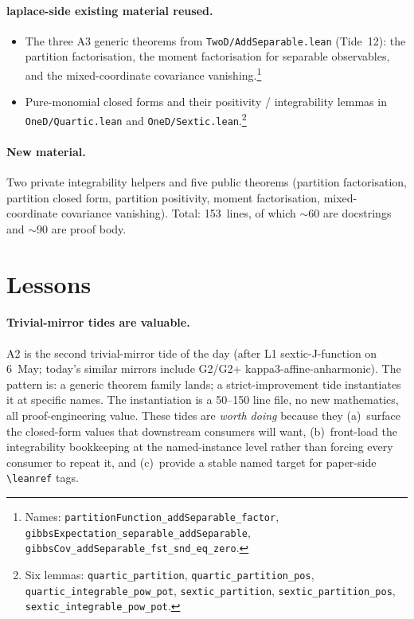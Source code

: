 \documentclass[11pt]{article}
\begin{document}
\paragraph{laplace-side existing material reused.}
\begin{itemize}[leftmargin=2em]
\item The three A3 generic theorems from \texttt{TwoD/AddSeparable.lean}
(Tide~12): the partition factorisation, the moment factorisation
for separable observables, and the mixed-coordinate covariance
vanishing.\footnote{Names: \texttt{partitionFunction\_addSeparable\_factor},
\texttt{gibbsExpectation\_separable\_addSeparable},
\texttt{gibbsCov\_addSeparable\_fst\_snd\_eq\_zero}.}

\item Pure-monomial closed forms and their positivity / integrability
lemmas in \texttt{OneD/Quartic.lean} and
\texttt{OneD/Sextic.lean}.\footnote{Six lemmas:
\texttt{quartic\_partition},
\texttt{quartic\_partition\_pos},
\texttt{quartic\_integrable\_pow\_pot},
\texttt{sextic\_partition},
\texttt{sextic\_partition\_pos},
\texttt{sextic\_integrable\_pow\_pot}.}
\end{itemize}

\paragraph{New material.} Two private integrability helpers and
five public theorems (partition factorisation, partition closed
form, partition positivity, moment factorisation, mixed-coordinate
covariance vanishing). Total: 153~lines, of which $\sim$60 are
docstrings and $\sim$90 are proof body.

\section{Lessons}

\paragraph{Trivial-mirror tides are valuable.}
A2 is the second trivial-mirror tide of the day (after L1 sextic-J-function
on 6~May; today's similar mirrors include G2/G2+ kappa3-affine-anharmonic).
The pattern is: a generic theorem family lands; a strict-improvement
tide instantiates it at specific names. The instantiation is a 50--150
line file, no new mathematics, all proof-engineering value. These
tides are \emph{worth doing} because they (a)~surface the closed-form
values that downstream consumers will want, (b)~front-load the
integrability bookkeeping at the named-instance level rather than
forcing every consumer to repeat it, and (c)~provide a stable named
target for paper-side \texttt{\textbackslash leanref} tags.
\end{document}
